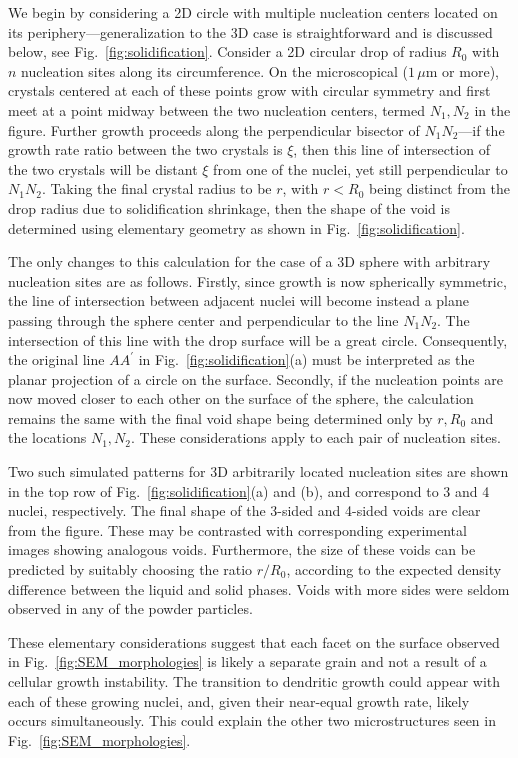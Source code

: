 \documentclass[11pt]{article}
\begin{document}
We begin by considering a 2D circle with multiple nucleation centers located on its periphery---generalization to the 3D case is straightforward and is discussed below, see Fig.~\ref{fig:solidification}. Consider a 2D circular drop of radius $R_0$ with $n$ nucleation sites along its circumference. On the microscopical ($1\,\mu$m or more), crystals centered at each of these points grow with circular symmetry and first meet at a point midway between the two nucleation centers, termed $N_1, N_2$ in the figure. Further growth proceeds along the perpendicular bisector of $N_1 N_2$---if the growth rate ratio between the two crystals is $\xi$, then this line of intersection of the two crystals will be distant $\xi$ from one of the nuclei, yet still perpendicular to $N_1 N_2$. Taking the final crystal radius to be $r$, with $r<R_0$ being distinct from the drop radius due to solidification shrinkage, then the shape of the void is determined using elementary geometry as shown in Fig.~\ref{fig:solidification}.

The only changes to this calculation for the case of a 3D sphere with arbitrary nucleation sites are as follows. Firstly, since growth is now spherically symmetric, the line of intersection between adjacent nuclei will become instead a plane passing through the sphere center and perpendicular to the line $N_1 N_2$. The intersection of this line with the drop surface will be a great circle. Consequently, the original line $AA^\prime$ in Fig.~\ref{fig:solidification}(a) must be interpreted as the planar projection of a circle on the surface. Secondly, if the nucleation points are now moved closer to each other on the surface of the sphere, the calculation remains the same with the final void shape being determined only by $r, R_0$ and the locations $N_1, N_2$. These considerations apply to each pair of nucleation sites.

Two such simulated patterns for 3D arbitrarily located nucleation sites are shown in the top row of Fig.~\ref{fig:solidification}(a) and (b), and correspond to 3 and 4 nuclei, respectively. The final shape of the 3-sided and 4-sided voids are clear from the figure. These may be contrasted with corresponding experimental images showing analogous voids. Furthermore, the size of these voids can be predicted by suitably choosing the ratio $r/R_0$, according to the expected density difference between the liquid and solid phases. Voids with more sides were seldom observed in any of the powder particles.

These elementary considerations suggest that each facet on the surface observed in Fig.~\ref{fig:SEM_morphologies} is likely a separate grain and not a result of a cellular growth instability. The transition to dendritic growth could appear with each of these growing nuclei, and, given their near-equal growth rate, likely occurs simultaneously. This could explain the other two microstructures seen in Fig.~\ref{fig:SEM_morphologies}. 
\end{document}
